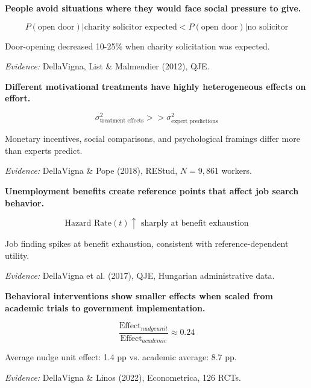 \begin{tcolorbox}[colback=red!5!white,colframe=red!75!black,title=Axiom DV-3: Social Pressure Avoidance]
\textbf{People avoid situations where they would face social pressure to give.}

\begin{equation}
P(\text{open door}) | \text{charity solicitor expected} < P(\text{open door}) | \text{no solicitor}
\end{equation}

Door-opening decreased 10-25\% when charity solicitation was expected.

\textit{Evidence:} DellaVigna, List \& Malmendier (2012), QJE.
\end{tcolorbox}

\begin{tcolorbox}[colback=red!5!white,colframe=red!75!black,title=Axiom DV-4: Motivation Heterogeneity]
\textbf{Different motivational treatments have highly heterogeneous effects on effort.}

\begin{equation}
\sigma^2_{\text{treatment effects}} >> \sigma^2_{\text{expert predictions}}
\end{equation}

Monetary incentives, social comparisons, and psychological framings differ more than experts predict.

\textit{Evidence:} DellaVigna \& Pope (2018), REStud, $N=9,861$ workers.
\end{tcolorbox}

\begin{tcolorbox}[colback=red!5!white,colframe=red!75!black,title=Axiom DV-5: Reference-Dependent Job Search]
\textbf{Unemployment benefits create reference points that affect job search behavior.}

\begin{equation}
\text{Hazard Rate}(t) \uparrow \text{ sharply at benefit exhaustion}
\end{equation}

Job finding spikes at benefit exhaustion, consistent with reference-dependent utility.

\textit{Evidence:} DellaVigna et al. (2017), QJE, Hungarian administrative data.
\end{tcolorbox}

\begin{tcolorbox}[colback=red!5!white,colframe=red!75!black,title=Axiom DV-6: Nudge Attenuation at Scale]
\textbf{Behavioral interventions show smaller effects when scaled from academic trials to government implementation.}

\begin{equation}
\frac{\text{Effect}_{nudge unit}}{\text{Effect}_{academic}} \approx 0.24
\end{equation}

Average nudge unit effect: 1.4 pp vs. academic average: 8.7 pp.

\textit{Evidence:} DellaVigna \& Linos (2022), Econometrica, 126 RCTs.
\end{tcolorbox}

